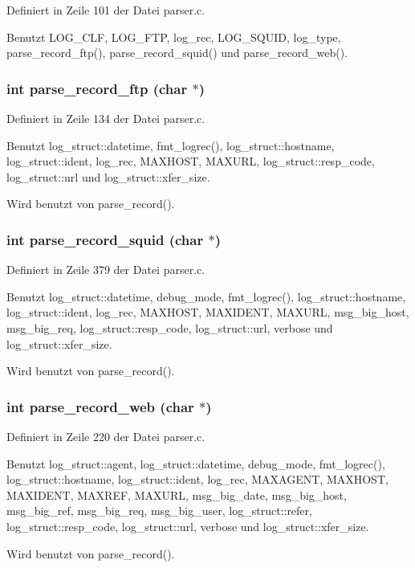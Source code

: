 Definiert in Zeile 101 der Datei parser.c.

Benutzt LOG\_\-CLF, LOG\_\-FTP, log\_\-rec, LOG\_\-SQUID, log\_\-type, parse\_\-record\_\-ftp(), parse\_\-record\_\-squid() und parse\_\-record\_\-web().
\subsubsection{\setlength{\rightskip}{0pt plus 5cm}int parse\_\-record\_\-ftp (char $\ast$)}\label{parser_8c_630c3ac0dab48c2fba68649da4bb871e}




Definiert in Zeile 134 der Datei parser.c.

Benutzt log\_\-struct::datetime, fmt\_\-logrec(), log\_\-struct::hostname, log\_\-struct::ident, log\_\-rec, MAXHOST, MAXURL, log\_\-struct::resp\_\-code, log\_\-struct::url und log\_\-struct::xfer\_\-size.

Wird benutzt von parse\_\-record().
\subsubsection{\setlength{\rightskip}{0pt plus 5cm}int parse\_\-record\_\-squid (char $\ast$)}\label{parser_8c_2b00ce99cc8f1387d75aeb7193968b21}




Definiert in Zeile 379 der Datei parser.c.

Benutzt log\_\-struct::datetime, debug\_\-mode, fmt\_\-logrec(), log\_\-struct::hostname, log\_\-struct::ident, log\_\-rec, MAXHOST, MAXIDENT, MAXURL, msg\_\-big\_\-host, msg\_\-big\_\-req, log\_\-struct::resp\_\-code, log\_\-struct::url, verbose und log\_\-struct::xfer\_\-size.

Wird benutzt von parse\_\-record().
\subsubsection{\setlength{\rightskip}{0pt plus 5cm}int parse\_\-record\_\-web (char $\ast$)}\label{parser_8c_f79ff394bf86e83cffbcb560096f5052}




Definiert in Zeile 220 der Datei parser.c.

Benutzt log\_\-struct::agent, log\_\-struct::datetime, debug\_\-mode, fmt\_\-logrec(), log\_\-struct::hostname, log\_\-struct::ident, log\_\-rec, MAXAGENT, MAXHOST, MAXIDENT, MAXREF, MAXURL, msg\_\-big\_\-date, msg\_\-big\_\-host, msg\_\-big\_\-ref, msg\_\-big\_\-req, msg\_\-big\_\-user, log\_\-struct::refer, log\_\-struct::resp\_\-code, log\_\-struct::url, verbose und log\_\-struct::xfer\_\-size.

Wird benutzt von parse\_\-record().